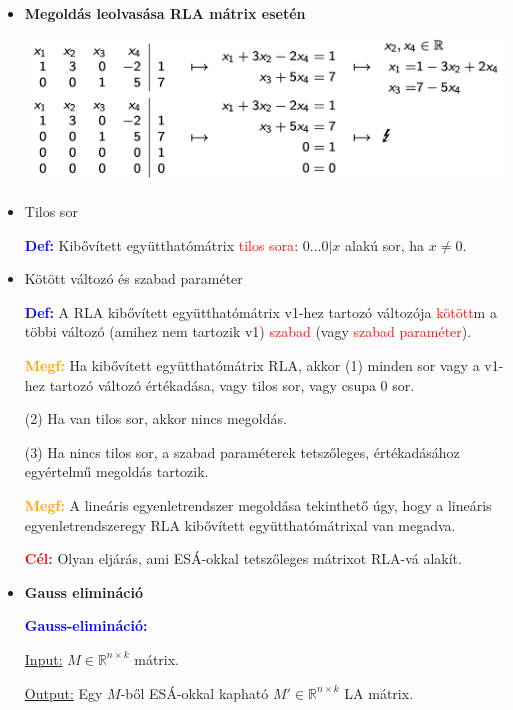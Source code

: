 \documentclass[../../szobeli.tex]{subfiles}
\begin{document}
\begin{itemize}
        \item \textbf{Megoldás leolvasása RLA mátrix esetén}
        
            \includegraphics[scale=0.38]{img/1.png}

        \item Tilos sor
        
            \textcolor{blue}{\textbf{Def:}} Kibővített együtthatómátrix \textcolor{red}{tilos sora}: $0 \dots 0 | x$ alakú sor, ha $x \neq 0$.

        \item Kötött változó és szabad paraméter
        
            \textcolor{blue}{\textbf{Def:}} A RLA kibővített együtthatómátrix v1-hez tartozó változója \textcolor{red}{kötött}m a többi változó (amihez nem tartozik v1) \textcolor{red}{szabad} (vagy \textcolor{red}{szabad paraméter}). 

            \textcolor{orange}{\textbf{Megf:}} Ha kibővített együtthatómátrix RLA, akkor (1) minden sor vagy a v1-hez tartozó változó értékadása, vagy tilos sor, vagy csupa 0 sor.

            (2) Ha van tilos sor, akkor nincs megoldás. 

            (3) Ha nincs tilos sor, a szabad paraméterek tetszőleges, értékadásához egyértelmű megoldás tartozik.

            \textcolor{orange}{\textbf{Megf:}} A lineáris egyenletrendszer megoldása tekinthető úgy, hogy a lineáris egyenletrendszeregy RLA kibővített együtthatómátrixal van megadva.

            \textcolor{red}{\textbf{Cél:}} Olyan eljárás, ami ESÁ-okkal tetszőleges mátrixot RLA-vá alakít.

        \item \textbf{Gauss elimináció}
        
            \textcolor{blue}{\textbf{Gauss-elimináció:}} 
            
            \underline{Input:} $M \in \mathbb{R}^{n \times k}$ mátrix.

            \underline{Output:} Egy $M$-ből ESÁ-okkal kapható $M' \in \mathbb{R}^{n \times k}$ LA mátrix.


\end{itemize}
\end{document}
